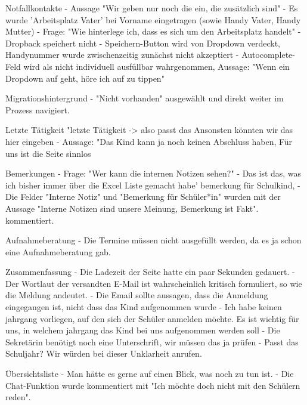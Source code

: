 Notfallkontakte
- Aussage "Wir geben nur noch die ein, die zusätzlich sind"
- Es wurde 'Arbeitsplatz Vater' bei Vorname eingetragen (sowie Handy Vater, Handy Mutter)
- Frage: "Wie hinterlege ich, dass es sich um den Arbeitsplatz handelt"	
- Dropback speichert nicht
- Speichern-Button wird von Dropdown verdeckt, Handynummer wurde zwischenzeitig zunächst nicht akzeptiert	
- Autocomplete-Feld wird als nicht individuell ausfüllbar wahrgenommen, Aussage: "Wenn ein Dropdown auf geht, höre ich auf zu tippen"							










Migrationshintergrund
- "Nicht vorhanden" ausgewählt und direkt weiter im Prozess navigiert.	














Letzte Tätigkeit
"letzte Tätigkeit -> also passt das 
Ansonsten könnten wir das hier eingeben
- Aussage: "Das Kind kann ja noch keinen Abschluss haben, Für uns ist die Seite sinnlos

Bemerkungen 
- Frage: "Wer kann die internen Notizen sehen?"
- Das ist das, was ich bisher immer über die Excel Liste gemacht habe' bemerkung für Schulkind, 
- Die Felder "Interne Notiz" und "Bemerkung für Schüler*in" wurden mit der Aussage "Interne Notizen sind unsere Meinung, Bemerkung ist Fakt".  kommentiert.									

Aufnahmeberatung										
- Die Termine müssen nicht ausgefüllt werden, da es ja schon eine Aufnahmeberatung gab.

Zusammenfassung
- Die Ladezeit der Seite hatte ein paar Sekunden gedauert.
- Der Wortlaut der versandten E-Mail ist wahrscheinlich kritisch formuliert, so wie die Meldung andeutet.
- Die Email sollte aussagen, dass die Anmeldung eingegangen ist, nicht dass das Kind aufgenommen wurde
- Ich habe keinen jahrgang vorliegen, auf den sich der Schüler anmelden möchte. Es ist wichtig für uns, in welchem jahrgang das Kind bei uns aufgenommen werden soll
- Die Sekretärin benötigt noch eine Unterschrift, wir müssen das ja prüfen
- Passt das Schuljahr? Wir würden bei dieser Unklarheit anrufen.

Übersichtsliste
- Man hätte es gerne auf einen Blick, was noch zu tun ist.
- Die Chat-Funktion wurde kommentiert mit "Ich möchte doch nicht mit den Schülern reden".

